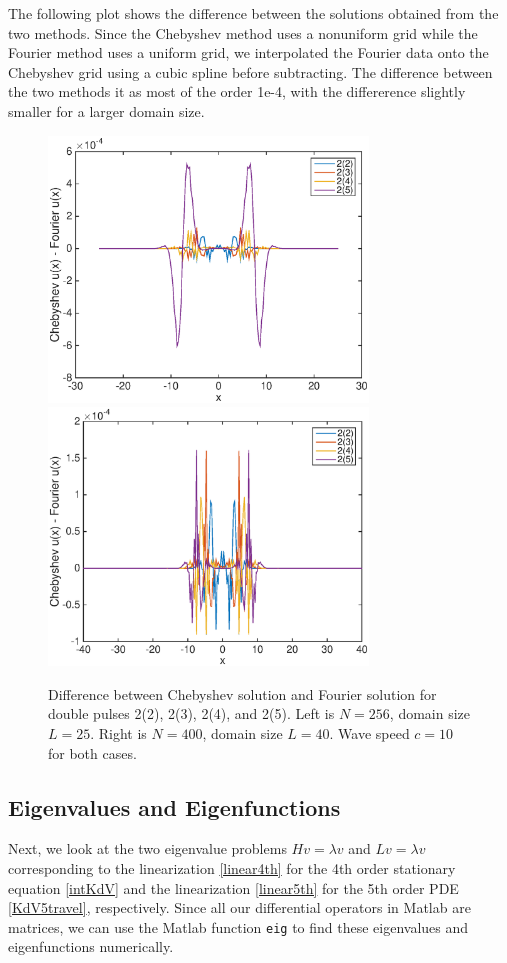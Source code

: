\documentclass[12pt]{article}
\begin{document}
The following plot shows the difference between the solutions obtained from the two methods. Since the Chebyshev method uses a nonuniform grid while the Fourier method uses a uniform grid, we interpolated the Fourier data onto the Chebyshev grid using a cubic spline before subtracting. The difference between the two methods it as most of the order 1e-4, with the differerence slightly smaller for a larger domain size.

\begin{figure}[H]
	\includegraphics[width=8.5cm]{chebfourdiff.eps}
	\includegraphics[width=8.5cm]{chebfourdiff40.eps}
	\caption{Difference between Chebyshev solution and Fourier solution for double pulses 2(2), 2(3), 2(4), and 2(5). Left is $N = 256$, domain size $L = 25$. Right is $N = 400$, domain size $L = 40$. Wave speed $c = 10$ for both cases.}
\end{figure}

\subsection{Eigenvalues and Eigenfunctions}

Next, we look at the two eigenvalue problems $Hv = \lambda v$ and $Lv = \lambda v$ corresponding to the linearization \eqref{linear4th} for the 4th order stationary equation \eqref{intKdV} and the linearization \eqref{linear5th} for the 5th order PDE \eqref{KdV5travel}, respectively. Since all our differential operators in Matlab are matrices, we can use the Matlab function \texttt{eig} to find these eigenvalues and eigenfunctions numerically. \\
\end{document}
